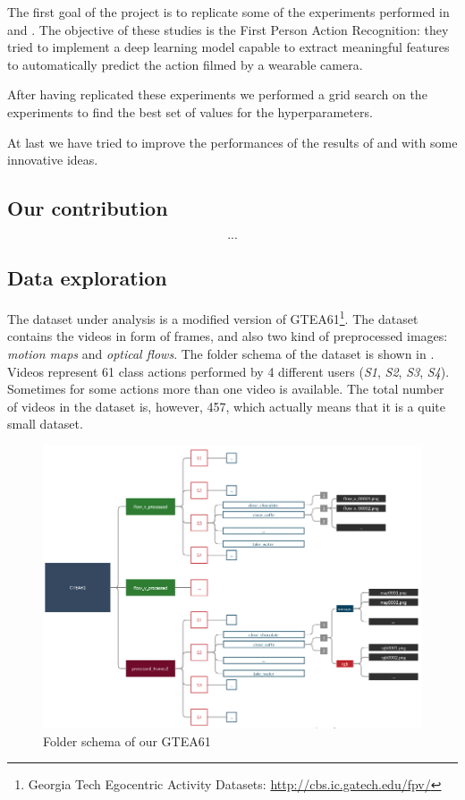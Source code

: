 \documentclass[10pt,twocolumn,hidelinks,letterpaper]{article}
\begin{document}
The first goal of the project is to replicate some of the experiments performed in \cite{egornn} and \cite{sparnet}. The objective of these studies is the First Person Action Recognition: they tried to implement a deep learning model capable to extract meaningful features to automatically predict the action filmed by a wearable camera.

After having replicated these experiments we performed a grid search on the experiments to find the best set of values for the hyperparameters.

At last we have tried to improve the performances of the results of \cite{egornn} and \cite{sparnet} with some innovative ideas.

\subsection{Our contribution}

\[...\]

\subsection{Data exploration}

The dataset under analysis is a modified version of GTEA61\footnote{Georgia Tech Egocentric Activity Datasets: \small{\url{http://cbs.ic.gatech.edu/fpv/}}}. The dataset contains the videos in form of frames, and also two kind of preprocessed images: \textit{motion maps} and \textit{optical flows}. The folder schema of the dataset is shown in . Videos represent 61 class actions performed by 4 different users (\textit{S1}, \textit{S2}, \textit{S3}, \textit{S4}). Sometimes for some actions more than one video is available. The total number of videos in the dataset is, however, 457, which actually means that it is a quite small dataset.

\begin{figure}
	\centering
	\includegraphics[width=.9\linewidth]{images/folder_schema.png}
	\caption{Folder schema of our GTEA61}
	\label{folder_schema}
\end{figure}
\end{document}
